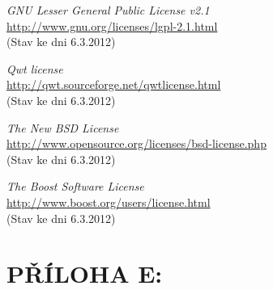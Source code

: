 \documentclass[12pt, a4paper, oneside]{article}
\newcommand{\It}{\textit}  %
\begin{document}
\begin{thebibliography}{99}
     \It{GNU Lesser General Public License v2.1} \\
    \url{http://www.gnu.org/licenses/lgpl-2.1.html}\\
    (Stav ke dni 6.3.2012)

     \It{Qwt license} \\
    \url{http://qwt.sourceforge.net/qwtlicense.html}\\
    (Stav ke dni 6.3.2012)

     \It{The New BSD License} \\
    \url{http://www.opensource.org/licenses/bsd-license.php}\\
    (Stav ke dni 6.3.2012)

     \It{The Boost Software License} \\
    \url{http://www.boost.org/users/license.html}\\
    (Stav ke dni 6.3.2012)

\end{thebibliography}

\newpage
\section*{PŘÍLOHA E:}
\listoffigures   %
\end{document}
